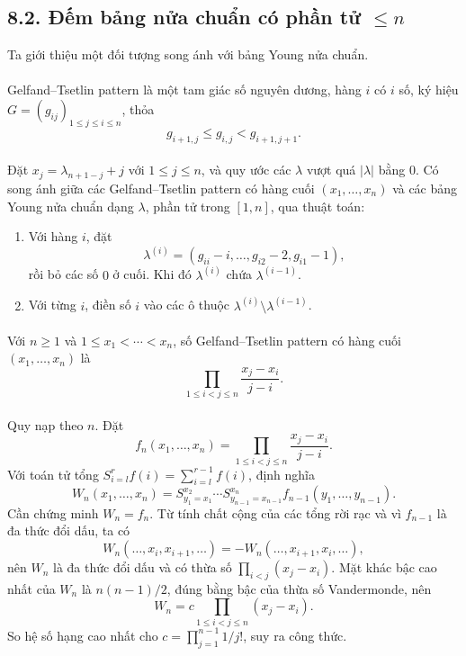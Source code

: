 \documentclass[11pt]{article}
\begin{document}
\subsection*{8.2. Đếm bảng nửa chuẩn có phần tử \(\le n\)}

Ta giới thiệu một đối tượng song ánh với bảng Young nửa chuẩn.

\paragraph{}
Gelfand--Tsetlin pattern là một tam giác số nguyên dương, hàng \(i\) có \(i\)
số, ký hiệu \(G=(g_{ij})_{1\le j\le i\le n}\), thỏa
\[
g_{i+1,j}\le g_{i,j}<g_{i+1,j+1}.
\]

\paragraph{}
Đặt \(x_j=\lambda_{n+1-j}+j\) với \(1\le j\le n\), và quy ước các
\(\lambda\) vượt quá \(|\lambda|\) bằng \(0\). Có song ánh giữa các
Gelfand--Tsetlin pattern có hàng cuối \((x_1,\ldots,x_n)\) và các bảng Young
nửa chuẩn dạng \(\lambda\), phần tử trong \([1,n]\), qua thuật toán:
\begin{enumerate}
  \item Với hàng \(i\), đặt
        \[
        \lambda^{(i)}=(g_{ii}-i,\ldots,g_{i2}-2,g_{i1}-1),
        \]
        rồi bỏ các số \(0\) ở cuối. Khi đó \(\lambda^{(i)}\) chứa
        \(\lambda^{(i-1)}\).
  \item Với từng \(i\), điền số \(i\) vào các ô thuộc
        \(\lambda^{(i)}\setminus\lambda^{(i-1)}\).
\end{enumerate}

\paragraph{}
Với \(n\ge1\) và \(1\le x_1<\cdots<x_n\), số Gelfand--Tsetlin pattern có hàng
cuối \((x_1,\ldots,x_n)\) là
\[
\prod_{1\le i<j\le n}\frac{x_j-x_i}{j-i}.
\]

\paragraph{}
Quy nạp theo \(n\). Đặt
\[
f_n(x_1,\ldots,x_n)=\prod_{1\le i<j\le n}\frac{x_j-x_i}{j-i}.
\]
Với toán tử tổng \(S^r_{i=l} f(i)=\sum_{i=l}^{r-1}f(i)\), định nghĩa
\[
W_n(x_1,\ldots,x_n)=
S^{x_2}_{y_1=x_1}\cdots S^{x_n}_{y_{n-1}=x_{n-1}}
f_{n-1}(y_1,\ldots,y_{n-1}).
\]
Cần chứng minh \(W_n=f_n\). Từ tính chất cộng của các tổng rời rạc và vì
\(f_{n-1}\) là đa thức đổi dấu, ta có
\[
W_n(\ldots,x_i,x_{i+1},\ldots)
=-W_n(\ldots,x_{i+1},x_i,\ldots),
\]
nên \(W_n\) là đa thức đổi dấu và có thừa số
\(\prod_{i<j}(x_j-x_i)\). Mặt khác bậc cao nhất của \(W_n\) là
\(n(n-1)/2\), đúng bằng bậc của thừa số Vandermonde, nên
\[
W_n=c\prod_{1\le i<j\le n}(x_j-x_i).
\]
So hệ số hạng cao nhất cho \(c=\prod_{j=1}^{n-1}1/j!\), suy ra công thức.
\end{document}
